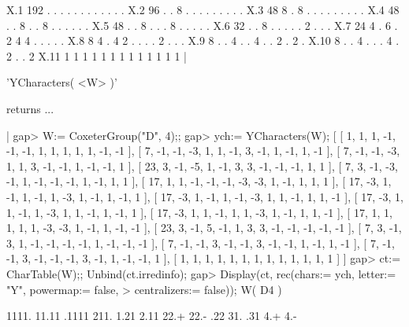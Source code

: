     X.1       192     .     .    .    .    .    .    .   .   .   .   .   .
    X.2        96     .     .    8    .    .    .    .   .   .   .   .   .
    X.3        48     8     .    8    .    .    .    .   .   .   .   .   .
    X.4        48     .     .    8    .    .    8    .   .   .   .   .   .
    X.5        48     .     .    8    .    .    .    8   .   .   .   .   .
    X.6        32     .     .    8    .    .    .    .   .   2   .   .   .
    X.7        24     4     .    6    .    2    4    4   .   .   .   .   .
    X.8         8     4     .    4    2    .    .    .   .   2   .   .   .
    X.9         8     .     .    4    .    .    4    .   .   2   .   2   .
    X.10        8     .     .    4    .    .    .    4   .   2   .   .   2
    X.11        1     1     1    1    1    1    1    1   1   1   1   1   1
|



'YCharacters( <W> )'

returns  ...

|    gap> W:= CoxeterGroup("D", 4);;
    gap> ych:= YCharacters(W);
    [ [ 1, 1, 1, -1, -1, -1, 1, 1, 1, 1, 1, -1, -1 ], 
      [ 7, -1, -1, -3, 1, 1, -1, 3, -1, 1, -1, 1, -1 ], 
      [ 7, -1, -1, -3, 1, 1, 3, -1, -1, 1, -1, -1, 1 ], 
      [ 23, 3, -1, -5, 1, -1, 3, 3, -1, -1, -1, 1, 1 ], 
      [ 7, 3, -1, -3, -1, 1, -1, -1, -1, 1, -1, 1, 1 ], 
      [ 17, 1, 1, -1, -1, -1, -3, -3, 1, -1, 1, 1, 1 ], 
      [ 17, -3, 1, -1, 1, -1, 1, -3, 1, -1, 1, -1, 1 ], 
      [ 17, -3, 1, -1, 1, -1, -3, 1, 1, -1, 1, 1, -1 ], 
      [ 17, -3, 1, 1, -1, 1, -3, 1, 1, -1, 1, -1, 1 ], 
      [ 17, -3, 1, 1, -1, 1, 1, -3, 1, -1, 1, 1, -1 ], 
      [ 17, 1, 1, 1, 1, 1, -3, -3, 1, -1, 1, -1, -1 ], 
      [ 23, 3, -1, 5, -1, 1, 3, 3, -1, -1, -1, -1, -1 ], 
      [ 7, 3, -1, 3, 1, -1, -1, -1, -1, 1, -1, -1, -1 ], 
      [ 7, -1, -1, 3, -1, -1, 3, -1, -1, 1, -1, 1, -1 ], 
      [ 7, -1, -1, 3, -1, -1, -1, 3, -1, 1, -1, -1, 1 ], 
      [ 1, 1, 1, 1, 1, 1, 1, 1, 1, 1, 1, 1, 1 ] ]
    gap> ct:= CharTable(W);;  Unbind(ct.irredinfo);
    gap> Display(ct, rec(chars:= ych, letter:= "Y", powermap:= false,
    >                    centralizers:= false));
    W( D4 )
    
            1111. 11.11 .1111 211. 1.21 2.11 22.+ 22.- .22 31. .31 4.+ 4.-
    
